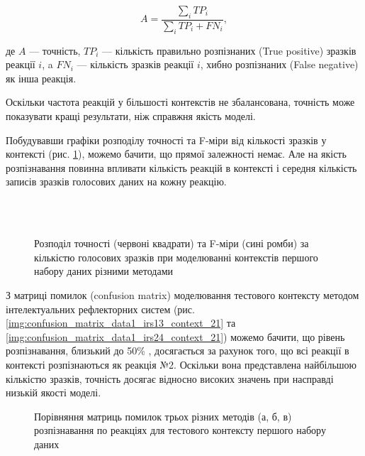 \begin{equation}
\label{eq:acuracy}
A=\frac{\sum\limits_i TP_i}{\sum\limits_i TP_i+FN_i},
\end{equation}

де $A$ --- точність, $TP_i$ --- кількість правильно розпізнаних (True positive) зразків реакції $i$, a $FN_i$ --- кількість зразків реакції $i$, хибно розпізнаних (False negative) як інша реакція.

Оскільки частота реакцій у більшості контекстів не збалансована, точність може показувати кращі результати, ніж справжня якість моделі.

Побудувавши графіки розподілу точності та F-міри від кількості зразків у контексті (рис. \ref{img:accuracy_distribution_data1}), можемо бачити, що прямої залежності немає. Але на якість розпізнавання повинна впливати кількість реакцій в контексті і середня кількість записів зразків голосових даних на кожну реакцію.

\begin{figure}[!t]
	\centering
	\\
	\\
	\caption{Розподіл точності (червоні квадрати) та F-міри (сині ромби) за кількістю голосових зразків при моделюванні контекстів першого набору даних різними методами}
	\label{img:accuracy_distribution_data1}
\end{figure}

З матриці помилок (confusion matrix) \cite{Stehman_1997} моделювання тестового контексту методом інтелектуальних рефлекторних систем (рис. \ref{img:confusion_matrix_data1_irs13_context_21} та \ref{img:confusion_matrix_data1_irs24_context_21}) можемо бачити, що рівень розпізнавання, близький до 50\% , досягається за рахунок того, що всі реакції в контексті розпізнаються як реакція №2. Оскільки вона представлена найбільшою кількістю зразків, точність досягає відносно високих значень при насправді низькій якості моделі.

\begin{figure}[!t]
	\centering
	
	\caption{Порівняння матриць помилок трьох різних методів (а, б, в) розпізнавання по реакціях для тестового контексту першого набору даних}
	\label{img:confusion_matrix_data1_context_21}
\end{figure}

